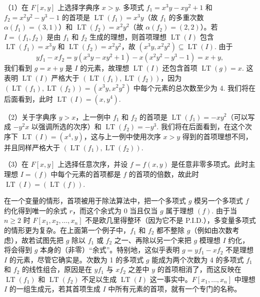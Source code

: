 \begin{example}
（1）在 \(F[x, y]\) 上选择字典序 \(x > y\). 多项式 \(f_1 = x^3y-xy^2+1\) 和 \(f_2 = x^2y^2-y^3-1\) 的首项是 \(\operatorname{LT}(f_1) = x^3y\)（故 \(f_1\) 的多重次数 \(\alpha(f_1) = (3,1)\)）和 \(\operatorname{LT}(f_2) = x^2y^2\)（故 \(\alpha(f_2) = (2,2)\)）。若 \(I = (f_1, f_2)\) 是由 \(f_1\) 和 \(f_2\) 生成的理想，则首项理想 \(\operatorname{LT}(I)\) 包含 \(\operatorname{LT}(f_1) = x^3y\) 和 \(\operatorname{LT}(f_2) = x^2y^2\)，故 \((x^3y, x^2y^2) \subseteq \operatorname{LT}(I)\). 由于
\[
yf_1 - xf_2 = y(x^3y-xy^2+1) - x(x^2y^2-y^3-1) = x+y,
\]
我们看到 \(g = x+y\) 是 \(I\) 的元素，故理想 \(\operatorname{LT}(I)\) 还包含首项 \(\operatorname{LT}(g) = x\). 这表明 \(\operatorname{LT}(I)\) 严格大于 \((\operatorname{LT}(f_1), \operatorname{LT}(f_2))\)，因为 \((\operatorname{LT}(f_1), \operatorname{LT}(f_2)) = (x^3y, x^2y^2)\) 中每个元素的总次数至少为 4. 我们将在后面看到，此时 \(\operatorname{LT}(I) = (x, y^4)\).

（2）关于字典序 \(y > x\)，上一例中 \(f_1\) 和 \(f_2\) 的首项是 \(\operatorname{LT}(f_1) = -xy^2\)（可以写成 \(-y^2x\) 以强调所选的次序）和 \(\operatorname{LT}(f_2) = -y^3\). 我们将在后面看到，在这个次序下 \(\operatorname{LT}(I) = (x^4, y)\)，这与上一例中使用次序 \(x > y\) 得到的首项理想不同，并且同样严格大于 \((\operatorname{LT}(f_1), \operatorname{LT}(f_2))\).

（3）在 \(F[x, y]\) 上选择任意次序，并设 \(f = f(x, y)\) 是任意非零多项式。此时主理想 \(I = (f)\) 中每个元素的首项都是 \(f\) 的首项的倍数，故此时 \(\operatorname{LT}(I) = (\operatorname{LT}(f))\).
\end{example}

在一个变量的情形，首项被用于除法算法中，把一个多项式 \(g\) 模另一个多项式 \(f\) 约化得到唯一的余式 \(r\)，而这个余式为 0 当且仅当 \(g\) 属于理想 \((f)\). 由于当 \(n \geq 2\) 时 \(F[x_1, x_2, \ldots, x_n]\) 不是欧几里得整环（因为它不是 P.I.D.），多变量多项式的情形更为复杂。在上面第一个例子中，\(f_1\) 和 \(f_2\) 都不整除 \(g\)（例如由次数考虑），故若试图先把 \(g\) 除以 \(f_1\) 或 \(f_2\) 之一、再除以另一个来把 \(g\) 模理想 \(I\) 约化，将会得到 \(g\) 本身的（非零）“余式”。特别地，这似乎表明 \(g = yf_1-xf_2\) 不是理想 \(I\) 的元素，尽管它确实是。次数为 1 的多项式 \(g\) 能成为两个次数为 4 的多项式 \(f_1\) 和 \(f_2\) 的线性组合，原因是在 \(yf_1\) 与 \(xf_2\) 之差中 \(y\) 的首项相消了，而这反映在 \(\operatorname{LT}(f_1)\) 和 \(\operatorname{LT}(f_2)\) 不足以生成 \(\operatorname{LT}(I)\) 这一事实中。\(F[x_1, \ldots, x_n]\) 中理想 \(I\) 的一组生成元，若其首项生成 \(I\) 中所有元素的首项，就有一个专门的名称。

